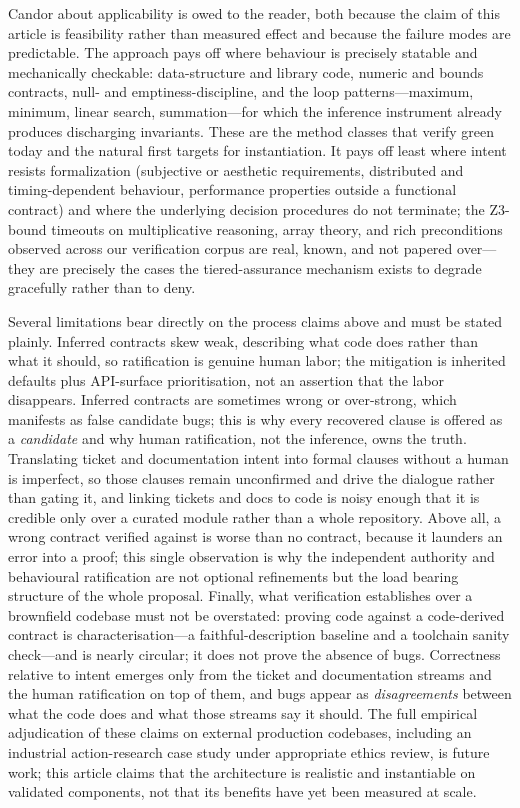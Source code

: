 Candor about applicability is owed to the reader, both because the claim of this
article is feasibility rather than measured effect and because the failure modes
are predictable. The approach pays off where behaviour is precisely statable and
mechanically checkable: data-structure and library code, numeric and bounds
contracts, null- and emptiness-discipline, and the loop patterns---maximum,
minimum, linear search, summation---for which the inference instrument already
produces discharging invariants. These are the method classes that verify green
today and the natural first targets for instantiation. It pays off least where
intent resists formalization (subjective or aesthetic requirements, distributed
and timing-dependent behaviour, performance properties outside a functional
contract) and where the underlying decision procedures do not terminate; the
Z3-bound timeouts on multiplicative reasoning, array theory, and rich
preconditions observed across our verification corpus are real, known, and not
papered over---they are precisely the cases the tiered-assurance mechanism exists
to degrade gracefully rather than to deny.

Several limitations bear directly on the process claims above and must be stated
plainly. Inferred contracts skew weak, describing what code does rather than
what it should, so ratification is genuine human labor; the mitigation is
inherited defaults plus API-surface prioritisation, not an assertion that the
labor disappears. Inferred contracts are sometimes wrong or over-strong, which
manifests as false candidate bugs; this is why every recovered clause is offered
as a \emph{candidate} and why human ratification, not the inference, owns the
truth. Translating ticket and documentation intent into formal clauses without a
human is imperfect, so those clauses remain unconfirmed and drive the dialogue
rather than gating it, and linking tickets and docs to code is noisy enough that
it is credible only over a curated module rather than a whole repository. Above
all, a wrong contract verified against is worse than no contract, because it
launders an error into a proof; this single observation is why the independent
authority and behavioural ratification are not optional refinements but the load
bearing structure of the whole proposal. Finally, what verification establishes
over a brownfield codebase must not be overstated: proving code against a
code-derived contract is characterisation---a faithful-description baseline and a
toolchain sanity check---and is nearly circular; it does not prove the absence of
bugs. Correctness relative to intent emerges only from the ticket and
documentation streams and the human ratification on top of them, and bugs appear
as \emph{disagreements} between what the code does and what those streams say it
should. The full empirical adjudication of these claims on external production
codebases, including an industrial action-research case study under appropriate
ethics review, is future work; this article claims that the architecture is
realistic and instantiable on validated components, not that its benefits have
yet been measured at scale.
